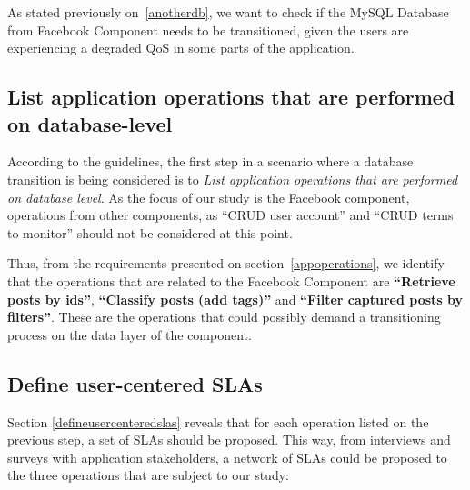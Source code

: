 As stated previously on~\ref{anotherdb}, we want to check if the MySQL Database from Facebook Component needs to be transitioned, given the users are experiencing a degraded QoS in some parts of the application. 

\subsection{List application operations that are performed on database-level}
According to the guidelines, the first step in a scenario where a database transition is being considered is to \textit{List application operations that are performed on database level}. As the focus of our study is the Facebook component, operations from other components, as ``CRUD user account'' and ``CRUD terms to monitor'' should not be considered at this point. 

Thus, from the requirements presented on section~\ref{appoperations}, we identify that the operations that are related to the Facebook Component are \textbf{``Retrieve posts by ids''}, \textbf{``Classify posts (add tags)''} and \textbf{``Filter captured posts by filters''}. These are the operations that could possibly demand a transitioning process on the data layer of the component.  

\subsection{Define user-centered SLAs}

Section \ref{defineusercenteredslas} reveals that for each operation listed on the previous step, a set of SLAs should be proposed. This way, from interviews and surveys with application stakeholders, a network of SLAs could be proposed to the three operations that are subject to our study: 

